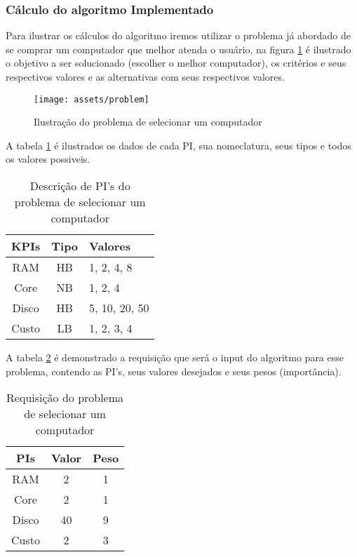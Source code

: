 \documentclass[12pt]{article}[abntex2]
\begin{document}
\subsubsection{Cálculo do algoritmo Implementado}
Para ilustrar os cálculos do algoritmo iremos utilizar o problema já abordado de se comprar um computador que melhor atenda o usuário, na figura \ref{fig:problemComp} é ilustrado o objetivo a ser solucionado (escolher o melhor computador), os critérios e seus respectivos valores e as alternativas com seus respectivos valores.

\begin{figure}[!h]
\texttt{[image: assets/problem]}
\caption{Ilustração do problema de selecionar um computador}
\label{fig:problemComp}
\end{figure}

 A tabela \ref{tab:valoresPIComp} é ilustrados os dados de cada PI, sua nomeclatura, seus tipos e todos os valores possiveis.

\begin{table}[ht]
\centering
\begin{adjustbox}{width=0.5\textwidth}
\small
\begin{tabular}{|c|c|l|}
   \hline
   KPIs  & Tipo & Valores \\
   \hline
   RAM  &  HB & 1, 2, 4, 8 \\
   Core  & NB & 1, 2, 4\\
   Disco & HB & 5, 10, 20, 50\\
   Custo & LB & 1, 2, 3, 4 \\
   \hline
\end{tabular}
\end{adjustbox}
\caption{Descrição de PI's do problema de selecionar um computador}
\label{tab:valoresPIComp}
\end{table} 

 A tabela \ref{tab:reqComp} é demonstrado a requisição que será o input do algoritmo para esse problema, contendo as PI's, seus valores desejados e seus pesos (importância).

\newpage
\begin{table}[ht]
\centering
\begin{adjustbox}{width=0.5\textwidth}
\small
\begin{tabular}{|c|c|c|}
   \hline
   PIs  & Valor & Peso \\
   \hline
   RAM  &  2 & 1 \\
   Core  & 2 & 1 \\
   Disco & 40 & 9 \\
   Custo & 2 & 3 \\
   \hline
\end{tabular}
\end{adjustbox}
\caption{Requisição do problema de selecionar um computador}
\label{tab:reqComp}
\end{table} 
\end{document}
